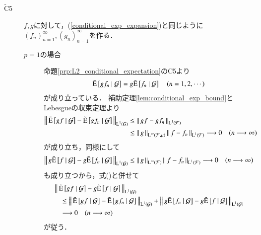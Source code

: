 \begin{prf}
\begin{description}
			\item[$\tilde{\mathrm{C}}$5]
				$f,g$に対して，(\ref{conditional_exp_expansion})と同じように$(f_n)_{n=1}^{\infty},(g_n)_{n=1}^{\infty}$を作る．
				\begin{description}
					\item[$p=1$の場合]
						命題\ref{prp:L2_conditional_expectation}のC5より
						\begin{align}
							\tcexp{gf_n}{\mathcal{G}} = g\tcexp{f_n}{\mathcal{G}}
							\quad (n=1,2,\cdots) \label{eq:conditional_exp_L1}
						\end{align}
						が成り立っている．
						補助定理\ref{lem:conditional_exp_bound}とLebesgueの収束定理より
						\begin{align}
							\Norm{\tcexp{gf}{\mathcal{G}} - \tcexp{gf_n}{\mathcal{G}}}{\Lp{1}{\mathcal{G}}}
							&\leq \Norm{gf - gf_n}{\Lp{1}{\mathcal{F}}} \\
							&\leq \Norm{g}{\Lp{\infty}{\mathcal{F},\mu}}\Norm{f - f_n}{\Lp{1}{\mathcal{F}}}
							\longrightarrow 0 \quad (n \longrightarrow \infty)
						\end{align}
						が成り立ち，同様にして
						\begin{align}
							\Norm{g\tcexp{f}{\mathcal{G}} - g\tcexp{f_n}{\mathcal{G}}}{\Lp{1}{\mathcal{G}}}
							\leq \Norm{g}{\Lp{\infty}{\mathcal{F}}} \Norm{f - f_n}{\Lp{1}{\mathcal{F}}}
							\longrightarrow 0 \quad (n \longrightarrow \infty)
						\end{align}
						も成り立つから，式()と併せて
						\begin{align}
							&\Norm{\tcexp{gf}{\mathcal{G}} - g\tcexp{f}{\mathcal{G}}}{\Lp{1}{\mathcal{G}}} \\
							&\quad \leq \Norm{\tcexp{gf}{\mathcal{G}} - \tcexp{gf_n}{\mathcal{G}}}{\Lp{1}{\mathcal{G}}}
								+ \Norm{g\tcexp{f_n}{\mathcal{G}} - g\tcexp{f}{\mathcal{G}}}{\Lp{1}{\mathcal{G}}} \\
							&\quad \longrightarrow 0 \quad (n \longrightarrow \infty)
						\end{align}
						が従う．
						

\end{description}
\end{description}
\end{prf}

